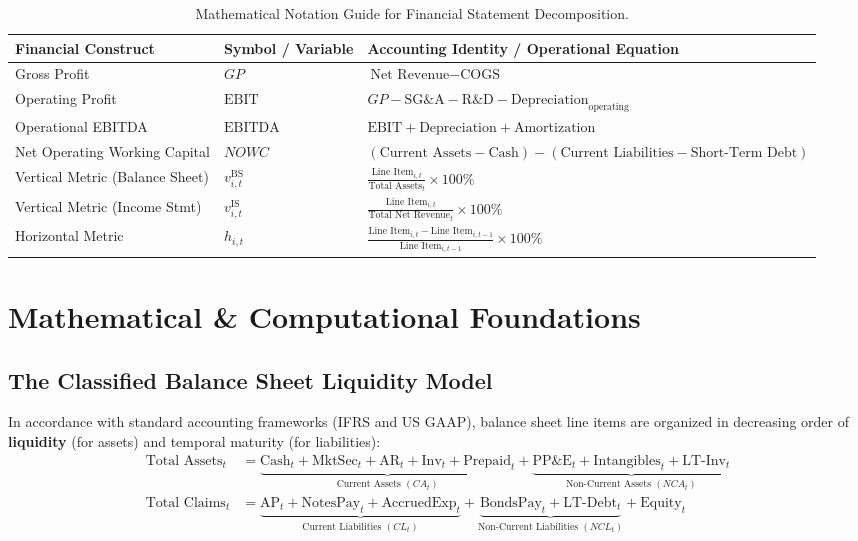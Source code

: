\begin{table}[htbp]
\centering
\small
\begin{tabularx}{\textwidth}{llX}
\toprule
\textbf{Financial Construct} & \textbf{Symbol / Variable} & \textbf{Accounting Identity / Operational Equation} \\
\midrule
Gross Profit & $GP$ & $\text{Net Revenue} - \text{COGS}$ \\
Operating Profit & $\text{EBIT}$ & $GP - \text{SG\&A} - \text{R\&D} - \text{Depreciation}_{\text{operating}}$ \\
Operational EBITDA & $\text{EBITDA}$ & $\text{EBIT} + \text{Depreciation} + \text{Amortization}$ \\
Net Operating Working Capital & $NOWC$ & $(\text{Current Assets} - \text{Cash}) - (\text{Current Liabilities} - \text{Short-Term Debt})$ \\
Vertical Metric (Balance Sheet) & $v_{i,t}^{\text{BS}}$ & $\frac{\text{Line Item}_{i,t}}{\text{Total Assets}_t} \times 100\%$ \\
Vertical Metric (Income Stmt) & $v_{i,t}^{\text{IS}}$ & $\frac{\text{Line Item}_{i,t}}{\text{Total Net Revenue}_t} \times 100\%$ \\
Horizontal Metric & $h_{i,t}$ & $\frac{\text{Line Item}_{i,t} - \text{Line Item}_{i,t-1}}{\text{Line Item}_{i,t-1}} \times 100\%$ \\
\bottomrule
\end{tabularx}
\caption{Mathematical Notation Guide for Financial Statement Decomposition.}
\label{tab:w2_notation}
\end{table}

\section{Mathematical \& Computational Foundations}

\subsection{The Classified Balance Sheet Liquidity Model}
In accordance with standard accounting frameworks (IFRS and US GAAP), balance sheet line items are organized in decreasing order of \textbf{liquidity} (for assets) and temporal maturity (for liabilities):
\begin{align}
\text{Total Assets}_t &= \underbrace{\text{Cash}_t + \text{MktSec}_t + \text{AR}_t + \text{Inv}_t + \text{Prepaid}_t}_{\text{Current Assets } (CA_t)} + \underbrace{\text{PP\&E}_t + \text{Intangibles}_t + \text{LT-Inv}_t}_{\text{Non-Current Assets } (NCA_t)} \\
\text{Total Claims}_t &= \underbrace{\text{AP}_t + \text{NotesPay}_t + \text{AccruedExp}_t}_{\text{Current Liabilities } (CL_t)} + \underbrace{\text{BondsPay}_t + \text{LT-Debt}_t}_{\text{Non-Current Liabilities } (NCL_t)} + \text{Equity}_t
\end{align}

